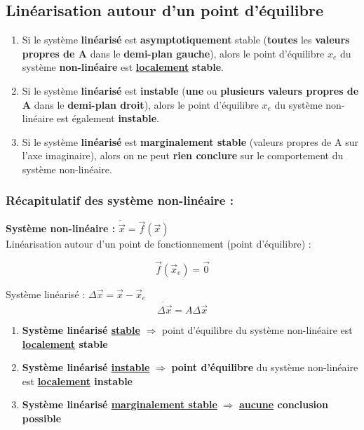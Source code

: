 \documentclass[document.tex]{subfiles}
\begin{document}
\subsection{Linéarisation autour d'un point d'équilibre}

\begin{enumerate}
\item Si le système \textbf{linéarisé} est \textbf{asymptotiquement} stable (\textbf{toutes} les \textbf{valeurs propres de A} dans le\textbf{ demi-plan gauche}), alors le point d'équilibre $x_e$ du système \textbf{non-linéaire} est \textbf{\underline{localement}} \textbf{stable}.
\item Si le système \textbf{linéarisé} est \textbf{instable} (\textbf{une} ou \textbf{plusieurs valeurs propres de A} dans le \textbf{demi-plan droit}), alors le point d'équilibre $x_e$ du système non-linéaire est également \textbf{instable}.
\item Si le système \textbf{linéarisé} est \textbf{marginalement stable} (valeurs propres de A sur l'axe imaginaire), alors on ne peut \textbf{rien conclure} sur le comportement du système non-linéaire.

\end{enumerate}

\subsubsection{Récapitulatif des système non-linéaire :}
\textbf{Système non-linéaire :} \hfill $ \boxed{\dot{\vec{x}}=\vec{f}(\vec{x})}$ \hfill \; \\

Linéarisation autour d'un point de fonctionnement (point d'équilibre) :

$$ \vec{f}(\vec{x}_e) = \vec{0} $$

Système linéarisé  : $\Delta \vec{x} = \vec{x} - \vec{x}_e$
$$ \boxed{\dot{\Delta \vec{x}} = A \Delta \vec{x}} $$

\begin{enumerate}
\item \textbf{Système linéarisé \underline{stable}} $\Rightarrow$ point d'équilibre du système non-linéaire est \textbf{\underline{localement} stable}
\item \textbf{Système linéarisé \underline{instable}} $\Rightarrow$ \textbf{point d'équilibre} du système non-linéaire est \textbf{\underline{localement} instable}
\item \textbf{Système linéarisé \underline{marginalement stable}} $\Rightarrow$ \textbf{\underline{aucune} conclusion possible}
\end{enumerate}
\end{document}
